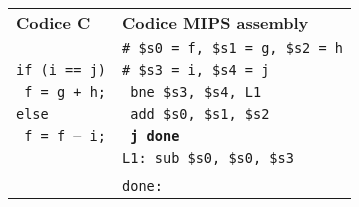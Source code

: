 \documentclass[../main.tex]{subfiles}
\begin{document}
\noindent
\begin{tabular}{ p{7cm} p{7cm} }
    \textbf{Codice C} & \textbf{Codice MIPS assembly} \\
    & \texttt{\# \$s0 = f, \$s1 = g, \$s2 = h} \\
	\texttt{if (i == j)} & \texttt{\# \$s3 = i, \$s4 = j} \\
    \texttt{ \hspace*{0cm} \hspace*{0cm} \hspace*{0cm} f = g + h;} & \texttt{ \hspace*{0cm} \hspace*{0cm} \hspace*{0cm} \hspace*{0cm} \hspace*{0cm} bne \$s3, \$s4, L1} \\
    \texttt{else} & \texttt{ \hspace*{0cm} \hspace*{0cm} \hspace*{0cm} \hspace*{0cm} \hspace*{0cm} add \$s0, \$s1, \$s2} \\
    \texttt{ \hspace*{0cm} \hspace*{0cm} \hspace*{0cm} f = f $–$ i;} & \texttt{ \hspace*{0cm} \hspace*{0cm} \hspace*{0cm} \hspace*{0cm} \hspace*{0cm} \textbf{j done}} \\
    & \texttt{L1: \hspace*{0cm} sub \$s0, \$s0, \$s3} \\
    \\
    & \texttt{done:} \\
\end{tabular}

\vspace*{2.5mm}
\end{document}

